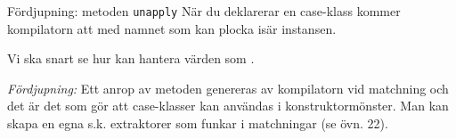 \begin{Slide}{Fördjupning: metoden \texttt{unapply}}\SlideFontSmall
När du deklarerar en case-klass kommer kompilatorn att  med namnet  som kan plocka isär instansen.
Vi ska snart se hur  kan hantera värden som  . \\
\pause

{\SlideFontTiny\vspace{1em}\emph{Fördjupning:} Ett anrop av metoden  genereras av kompilatorn vid matchning och det är det som gör att case-klasser kan användas i konstruktormönster. Man kan skapa en egna s.k. extraktorer  som funkar i matchningar (se övn. 22).}
\end{Slide}
